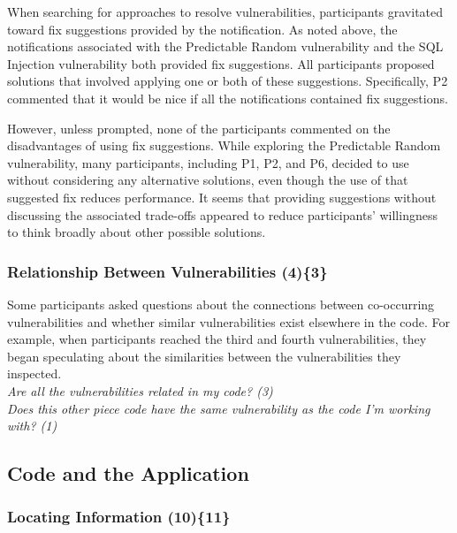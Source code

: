 \documentclass{sig-alternate}
\begin{document}
 
When searching for approaches to resolve vulnerabilities, participants gravitated toward fix suggestions provided by the notification.
As noted above, the notifications associated with the Predictable Random vulnerability and the SQL Injection vulnerability both provided fix suggestions.
All participants proposed solutions that involved applying one or both of these suggestions. 
Specifically, P2 commented that it would be nice if all the notifications contained fix suggestions.

However, unless prompted, none of the participants commented on the disadvantages of using fix suggestions.
While exploring the Predictable Random vulnerability, many participants, including P1, P2, and P6, decided to use  without considering any alternative solutions, even though the use of that suggested fix reduces performance.
It seems that providing suggestions without discussing the associated trade-offs appeared to reduce participants' willingness to think broadly about other possible solutions. 



\subsubsection{\textbf{Relationship Between Vulnerabilities (4)\{3\}}}\label{rbb}

Some participants asked questions about the connections between co-occurring vulnerabilities and whether similar vulnerabilities exist elsewhere in the code. 
For example, when participants reached the third and fourth vulnerabilities, they began speculating about the similarities between the vulnerabilities they inspected.
\\

\noindent\emph{Are all the vulnerabilities related in my code? (3)} \\
\emph{Does this other piece code have the same vulnerability as the code I'm working with? (1)} 


\subsection{Code and the Application}
\vspace{-3mm}
\label{sec:results-ca}
\subsubsection{\textbf{Locating Information (10)\{11\}}}\label{li}
\end{document}

